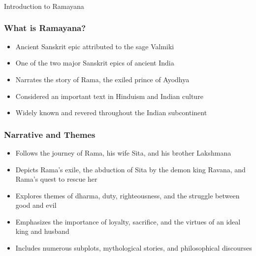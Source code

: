 \begin{frame}[fragile]\frametitle{}
\begin{center}
{\Large Introduction to Ramayana}
\end{center}
\end{frame}

\begin{frame}[fragile]\frametitle{What is Ramayana?}
    \begin{itemize}
        \item Ancient Sanskrit epic attributed to the sage Valmiki
        \item One of the two major Sanskrit epics of ancient India
        \item Narrates the story of Rama, the exiled prince of Ayodhya
        \item Considered an important text in Hinduism and Indian culture
        \item Widely known and revered throughout the Indian subcontinent
    \end{itemize}
\end{frame}

\begin{frame}[fragile]\frametitle{Narrative and Themes}
    \begin{itemize}
        \item Follows the journey of Rama, his wife Sita, and his brother Lakshmana
        \item Depicts Rama's exile, the abduction of Sita by the demon king Ravana, and Rama's quest to rescue her
        \item Explores themes of dharma, duty, righteousness, and the struggle between good and evil
        \item Emphasizes the importance of loyalty, sacrifice, and the virtues of an ideal king and husband
        \item Includes numerous subplots, mythological stories, and philosophical discourses
    \end{itemize}
\end{frame}

